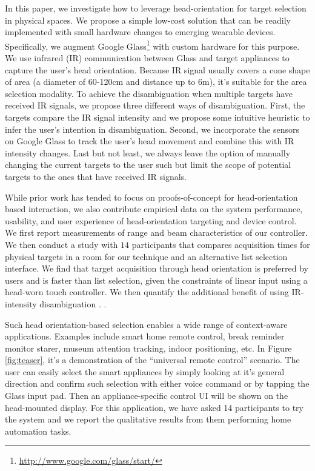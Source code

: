 In this paper, we investigate how to leverage head-orientation for target selection in physical spaces. We propose a simple low-cost solution that can be readily implemented with small hardware changes to emerging wearable devices. Specifically, we augment Google Glass\footnote{\url{http://www.google.com/glass/start/}} with custom hardware for this purpose. We use infrared (IR) communication between Glass and target appliances to capture the user's head orientation. Because IR signal usually covers a cone shape of area (a diameter of 60-120cm and distance up to 6m), it's suitable for the area selection modality. To achieve the disambiguation when multiple targets have received IR signals, we propose three different ways of disambiguation. First, the targets compare the IR signal intensity and we propose some intuitive heuristic to infer the user's intention in disambiguation. Second, we incorporate the sensors on Google Glass to track the user's head movement and combine this with IR intensity changes. Last but not least, we always leave the option of manually changing the current targets to the user such but limit the scope of potential targets to the ones that have received IR signals.

While prior work has tended to focus on proofs-of-concept for head-orientation based interaction, we also contribute empirical data on the system performance, usability, and user experience of head-orientation targeting and device control. We first report measurements of range and beam characteristics of our controller. We then conduct a study with $14$ participants that compares acquisition times for physical targets in a room for our technique and an alternative list selection interface. We find that target acquisition through head orientation is preferred by users and is faster than list selection, given the constraints of linear input using a head-worn touch controller. 
We then quantify the additional benefit of using IR-intensity disambiguation . .

Such head orientation-based selection enables a wide range of context-aware applications. Examples include smart home remote control, break reminder monitor starer, museum attention tracking, indoor positioning, etc. In Figure\,\ref{fig:teaser}, it's a demonstration of the ``universal remote control'' scenario. The user can easily select the smart appliances by simply looking at it's general direction and confirm such selection with either voice command or by tapping the Glass input pad. Then an appliance-specific control UI will be shown on the head-mounted display. For this application, we have asked 14 participants to try the system and we report the qualitative results from them performing home automation tasks.

